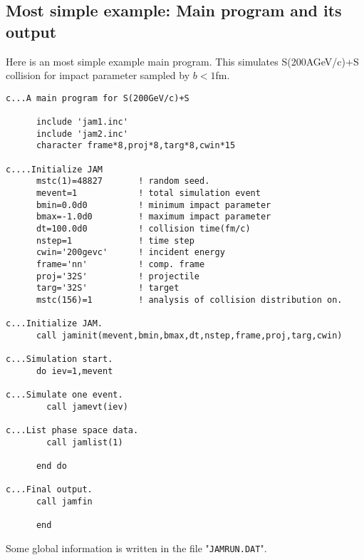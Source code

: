 \documentclass[]{article}
\newcommand{\ttt}[1]{{\tt#1}}
\begin{document}
\subsection{Most simple example: Main program and its output}
Here is an most simple example main program. This simulates
S(200AGeV/c)+S collision for impact parameter sampled by $b<1$fm.

\begin{verbatim}
c...A main program for S(200GeV/c)+S

      include 'jam1.inc'
      include 'jam2.inc'
      character frame*8,proj*8,targ*8,cwin*15

c....Initialize JAM
      mstc(1)=48827       ! random seed.
      mevent=1            ! total simulation event
      bmin=0.0d0          ! minimum impact parameter
      bmax=-1.0d0         ! maximum impact parameter
      dt=100.0d0          ! collision time(fm/c)
      nstep=1             ! time step
      cwin='200gevc'      ! incident energy
      frame='nn'          ! comp. frame
      proj='32S'          ! projectile
      targ='32S'          ! target
      mstc(156)=1         ! analysis of collision distribution on.

c...Initialize JAM.
      call jaminit(mevent,bmin,bmax,dt,nstep,frame,proj,targ,cwin)

c...Simulation start.
      do iev=1,mevent

c...Simulate one event.
        call jamevt(iev)

c...List phase space data.
        call jamlist(1)

      end do

c...Final output.
      call jamfin

      end
\end{verbatim}


Some global information is written in the file "\ttt{JAMRUN.DAT}". 
\end{document}
